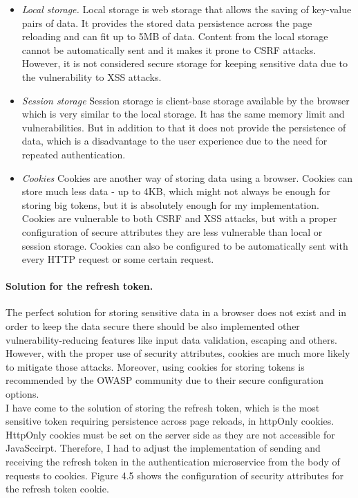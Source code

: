 \begin{itemize}
    \item \emph{Local storage.} Local storage is web storage that allows the saving of key-value pairs of data. It provides the stored data persistence across the page reloading and can fit up to 5MB of data. Content from the local storage cannot be automatically sent and it makes it prone to CSRF attacks. However, it is not considered secure storage for keeping sensitive data due to the vulnerability to XSS attacks.
    \item \emph{Session storage} Session storage is client-base storage available by the browser which is very similar to the local storage. It has the same memory limit and vulnerabilities. But in addition to that it does not provide the persistence of data, which is a disadvantage to the user experience due to the need for repeated authentication.
    \item \emph{Cookies} Cookies are another way of storing data using a browser. Cookies can store much less data - up to 4KB, which might not always be enough for storing big tokens, but it is absolutely enough for my implementation. Cookies are vulnerable to both CSRF and XSS attacks, but with a proper configuration of secure attributes they are less vulnerable than local or session storage. Cookies can also be configured to be automatically sent with every HTTP request or some certain request.
\end{itemize}

\paragraph*{Solution for the refresh token.} The perfect solution for storing sensitive data in a browser does not exist and in order to keep the data secure there should be also implemented other vulnerability-reducing features like input data validation, escaping and others. However, with the proper use of security attributes, cookies are much more likely to mitigate those attacks. Moreover, using cookies for storing tokens is recommended by the OWASP community due to their secure configuration options. \\
I have come to the solution of storing the refresh token, which is the most sensitive token requiring persistence across page reloads, in httpOnly cookies. HttpOnly cookies must be set on the server side as they are not accessible for JavaSccirpt. Therefore, I had to adjust the implementation of sending and receiving the refresh token in the authentication microservice from the body of requests to cookies. Figure 4.5 shows the configuration of security attributes for the refresh token cookie.\\

